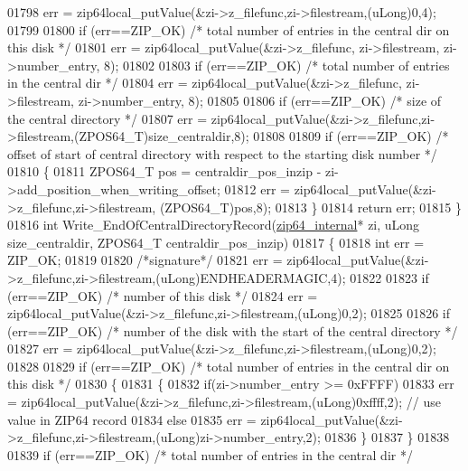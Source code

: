 \begin{DoxyCode}
01798     err = zip64local\_putValue(&zi->z\_filefunc,zi->filestream,(uLong)0,4);
01799 
01800   \textcolor{keywordflow}{if} (err==ZIP\_OK) \textcolor{comment}{/* total number of entries in the central dir on this disk */}
01801     err = zip64local\_putValue(&zi->z\_filefunc, zi->filestream, zi->number\_entry, 8);
01802 
01803   \textcolor{keywordflow}{if} (err==ZIP\_OK) \textcolor{comment}{/* total number of entries in the central dir */}
01804     err = zip64local\_putValue(&zi->z\_filefunc, zi->filestream, zi->number\_entry, 8);
01805 
01806   \textcolor{keywordflow}{if} (err==ZIP\_OK) \textcolor{comment}{/* size of the central directory */}
01807     err = zip64local\_putValue(&zi->z\_filefunc,zi->filestream,(ZPOS64\_T)size\_centraldir,8);
01808 
01809   \textcolor{keywordflow}{if} (err==ZIP\_OK) \textcolor{comment}{/* offset of start of central directory with respect to the starting disk number */}
01810   \{
01811     ZPOS64\_T pos = centraldir\_pos\_inzip - zi->add\_position\_when\_writing\_offset;
01812     err = zip64local\_putValue(&zi->z\_filefunc,zi->filestream, (ZPOS64\_T)pos,8);
01813   \}
01814   \textcolor{keywordflow}{return} err;
01815 \}
01816 \textcolor{keywordtype}{int} Write\_EndOfCentralDirectoryRecord(\hyperlink{structzip64__internal}{zip64\_internal}* zi, uLong size\_centraldir, ZPOS64\_T 
      centraldir\_pos\_inzip)
01817 \{
01818   \textcolor{keywordtype}{int} err = ZIP\_OK;
01819 
01820   \textcolor{comment}{/*signature*/}
01821   err = zip64local\_putValue(&zi->z\_filefunc,zi->filestream,(uLong)ENDHEADERMAGIC,4);
01822 
01823   \textcolor{keywordflow}{if} (err==ZIP\_OK) \textcolor{comment}{/* number of this disk */}
01824     err = zip64local\_putValue(&zi->z\_filefunc,zi->filestream,(uLong)0,2);
01825 
01826   \textcolor{keywordflow}{if} (err==ZIP\_OK) \textcolor{comment}{/* number of the disk with the start of the central directory */}
01827     err = zip64local\_putValue(&zi->z\_filefunc,zi->filestream,(uLong)0,2);
01828 
01829   \textcolor{keywordflow}{if} (err==ZIP\_OK) \textcolor{comment}{/* total number of entries in the central dir on this disk */}
01830   \{
01831     \{
01832       \textcolor{keywordflow}{if}(zi->number\_entry >= 0xFFFF)
01833         err = zip64local\_putValue(&zi->z\_filefunc,zi->filestream,(uLong)0xffff,2); \textcolor{comment}{// use value in ZIP64
       record}
01834       \textcolor{keywordflow}{else}
01835         err = zip64local\_putValue(&zi->z\_filefunc,zi->filestream,(uLong)zi->number\_entry,2);
01836     \}
01837   \}
01838 
01839   \textcolor{keywordflow}{if} (err==ZIP\_OK) \textcolor{comment}{/* total number of entries in the central dir */}

\end{DoxyCode}
